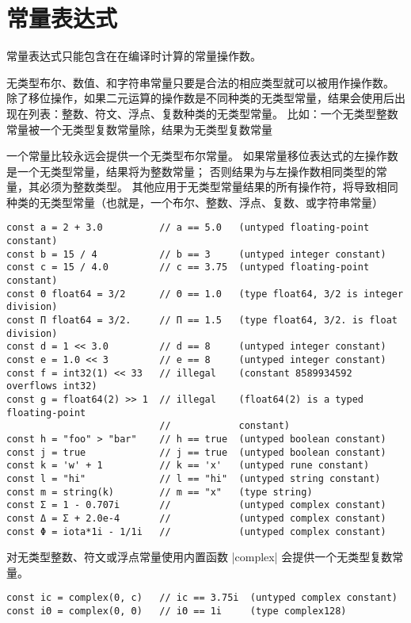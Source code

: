 \section{常量表达式}
常量表达式只能包含在在编译时计算的常量操作数。

无类型布尔、数值、和字符串常量只要是合法的相应类型就可以被用作操作数。
除了移位操作，如果二元运算的操作数是不同种类的无类型常量，结果会使用后出现在列表：整数、符文、浮点、复数种类的无类型常量。
比如：一个无类型整数常量被一个无类型复数常量除，结果为无类型复数常量

一个常量比较永远会提供一个无类型布尔常量。
如果常量移位表达式的左操作数是一个无类型常量，结果将为整数常量；
否则结果为与左操作数相同类型的常量，其必须为整数类型。
其他应用于无类型常量结果的所有操作符，将导致相同种类的无类型常量（也就是，一个布尔、整数、浮点、复数、或字符串常量）
\begin{lstlisting}[style=golang]
const a = 2 + 3.0          // a == 5.0   (untyped floating-point constant)
const b = 15 / 4           // b == 3     (untyped integer constant)
const c = 15 / 4.0         // c == 3.75  (untyped floating-point constant)
const Θ float64 = 3/2      // Θ == 1.0   (type float64, 3/2 is integer division)
const Π float64 = 3/2.     // Π == 1.5   (type float64, 3/2. is float division)
const d = 1 << 3.0         // d == 8     (untyped integer constant)
const e = 1.0 << 3         // e == 8     (untyped integer constant)
const f = int32(1) << 33   // illegal    (constant 8589934592 overflows int32)
const g = float64(2) >> 1  // illegal    (float64(2) is a typed floating-point 
						   //		 	 constant)
const h = "foo" > "bar"    // h == true  (untyped boolean constant)
const j = true             // j == true  (untyped boolean constant)
const k = 'w' + 1          // k == 'x'   (untyped rune constant)
const l = "hi"             // l == "hi"  (untyped string constant)
const m = string(k)        // m == "x"   (type string)
const Σ = 1 - 0.707i       //            (untyped complex constant)
const Δ = Σ + 2.0e-4       //            (untyped complex constant)
const Φ = iota*1i - 1/1i   //            (untyped complex constant)
\end{lstlisting}

对无类型整数、符文或浮点常量使用内置函数 \code|complex| 会提供一个无类型复数常量。
\begin{lstlisting}[style=golang]
const ic = complex(0, c)   // ic == 3.75i  (untyped complex constant)
const iΘ = complex(0, Θ)   // iΘ == 1i     (type complex128)
\end{lstlisting}


